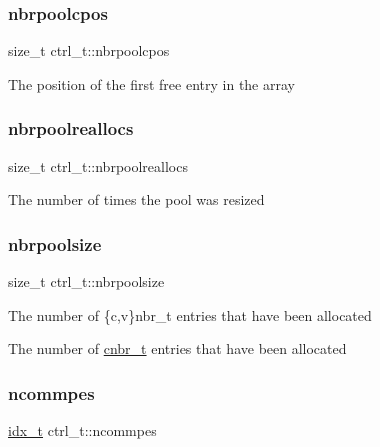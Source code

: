 \mbox{\label{structctrl__t_acafe4ebea8585403e053dc33e7b4ac64}} 
\subsubsection{\texorpdfstring{nbrpoolcpos}{nbrpoolcpos}}
{\footnotesize\ttfamily size\+\_\+t ctrl\+\_\+t\+::nbrpoolcpos}

The position of the first free entry in the array \mbox{\label{structctrl__t_a091baa9be72262dca61c641d1f1e4ad3}} 
\subsubsection{\texorpdfstring{nbrpoolreallocs}{nbrpoolreallocs}}
{\footnotesize\ttfamily size\+\_\+t ctrl\+\_\+t\+::nbrpoolreallocs}

The number of times the pool was resized \mbox{\label{structctrl__t_ae37af5d894dbeea35f735361503e58a9}} 
\subsubsection{\texorpdfstring{nbrpoolsize}{nbrpoolsize}}
{\footnotesize\ttfamily size\+\_\+t ctrl\+\_\+t\+::nbrpoolsize}

The number of \{c,v\}nbr\+\_\+t entries that have been allocated

The number of \hyperlink{structcnbr__t}{cnbr\+\_\+t} entries that have been allocated \mbox{\label{structctrl__t_a120ba1a44430e6e9655edaebed67f249}} 
\subsubsection{\texorpdfstring{ncommpes}{ncommpes}}
{\footnotesize\ttfamily \hyperlink{3rd_party_2parmetis-4_80_83_2metis_2include_2metis_8h_aaa5262be3e700770163401acb0150f52}{idx\+\_\+t} ctrl\+\_\+t\+::ncommpes}

